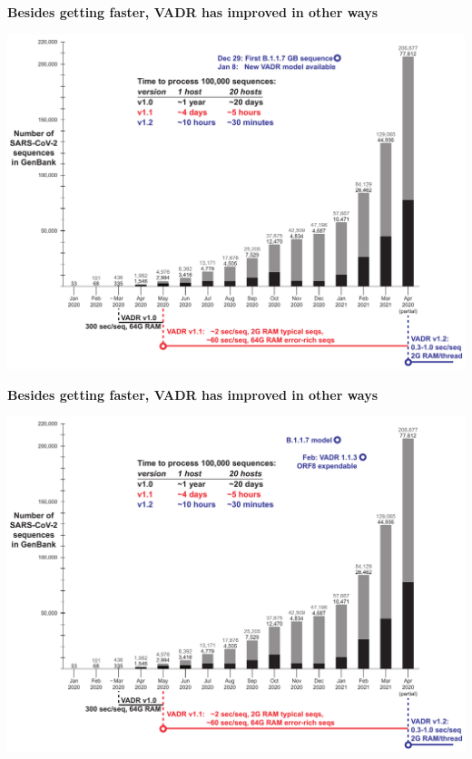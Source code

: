 \documentclass[landscape]{slides}
\begin{document}
%
\begin{slide}
\begin{center}
\textbf{Besides getting faster, VADR has improved in other ways}

\includegraphics[width=10.25in]{figs/sars-counts-jan2020-apr2021-slide4}

\end{center}

\vfill
\end{slide}
\begin{slide}
\begin{center}
\textbf{Besides getting faster, VADR has improved in other ways}

\includegraphics[width=10.25in]{figs/sars-counts-jan2020-apr2021-slide5}

\end{center}

\vfill
\end{slide}
\end{document}
